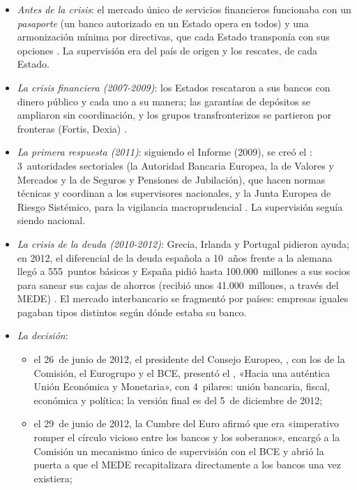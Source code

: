 \documentclass[11pt]{article}
\begin{document}
\begin{itemize}
\item \emph{Antes de la crisis}: el mercado único de servicios financieros funcionaba con un \emph{pasaporte} (un banco autorizado en un Estado opera en todos) y una armonización mínima por directivas, que cada Estado transponía con sus opciones . La supervisión era del país de origen y los rescates, de cada Estado.
\item \emph{La crisis financiera (2007-2009)}: los Estados rescataron a sus bancos con dinero público y cada uno a su manera; las garantías de depósitos se ampliaron sin coordinación, y los grupos transfronterizos se partieron por fronteras (Fortis, Dexia) .
\item \emph{La primera respuesta (2011)}: siguiendo el Informe  (2009), se creó el : 3~autoridades sectoriales (la Autoridad Bancaria Europea, la de Valores y Mercados y la de Seguros y Pensiones de Jubilación), que hacen normas técnicas y coordinan a los supervisores nacionales, y la Junta Europea de Riesgo Sistémico, para la vigilancia macroprudencial  . La supervisión seguía siendo nacional.
\item \emph{La crisis de la deuda (2010-2012)}: Grecia, Irlanda y Portugal pidieron ayuda; en 2012, el diferencial de la deuda española a 10~años frente a la alemana llegó a 555~puntos básicos y España pidió hasta 100.000~millones a sus socios para sanear sus cajas de ahorros (recibió unos 41.000~millones, a través del MEDE)\nocite{MEDE2026Espana}  . El mercado interbancario se fragmentó por países: empresas iguales pagaban tipos distintos según dónde estaba su banco.
\item \emph{La decisión}:
  \begin{itemize}
  \item el 26~de junio de 2012, el presidente del Consejo Europeo, , con los de la Comisión, el Eurogrupo y el BCE, presentó el , «Hacia una auténtica Unión Económica y Monetaria», con 4~pilares: unión bancaria, fiscal, económica y política; la versión final es del 5~de diciembre de 2012\nocite{VanRompuy2012Genuina};
  \item el 29~de junio de 2012, la Cumbre del Euro afirmó que era «imperativo romper el círculo vicioso entre los bancos y los soberanos», encargó a la Comisión un mecanismo único de supervisión con el BCE y abrió la puerta a que el MEDE recapitalizara directamente a los bancos una vez existiera\nocite{EuroCumbre2012};

\end{itemize}
\end{itemize}
\end{document}
